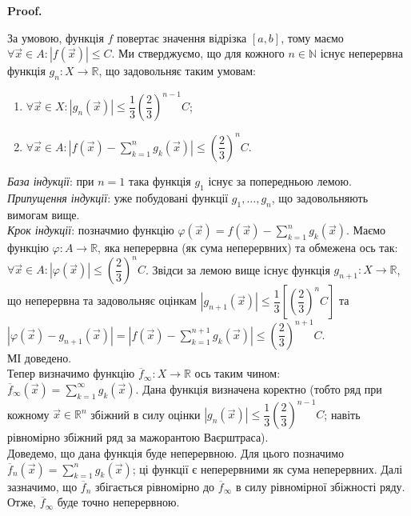 \documentclass[a4paper, 10pt]{article}
\makeatletter
\def\qed{$\blacksquare$}
\theoremstyle{theoremdd}
\theoremstyle{theoremdd}
\theoremstyle{theoremdd}
\theoremstyle{theoremdd}
\theoremstyle{theoremdd}
\theoremstyle{theoremdd}
\theoremstyle{theoremdd}
\theoremstyle{theoremdd}
\renewenvironment{proof}[1][Proof.\\]{\par
\pushQED{\hfill \qed}%
\normalfont \topsep6\p@\@plus6\p@\relax
\trivlist
\item\relax
{\bfseries
#1\@addpunct{.}}\hspace\labelsep\ignorespaces
}{%
\popQED\endtrivlist\@endpefalse
}
\makeatother
\begin{document}
\begin{proof}
За умовою, функція $f$ повертає значення відрізка $[a,b]$, тому маємо $\forall \vec{x} \in A: |f(\vec{x})| \leq C$. Ми стверджуємо, що для кожного $n \in \mathbb{N}$ існує неперервна функція $g_n \colon X \to \mathbb{R}$, що задовольняє таким умовам:
\begin{enumerate}[nosep,wide=0pt,label={\arabic*)}]
\item $\forall \vec{x} \in X: |g_n(\vec{x})| \leq \dfrac{1}{3} \left( \dfrac{2}{3}\right)^{n-1} C$;
\item $\forall \vec{x} \in A: \displaystyle\left| f(\vec{x}) - \sum_{k=1}^n g_k(\vec{x}) \right| \leq \left( \dfrac{2}{3} \right)^n C$.
\end{enumerate}
\textit{База індукції}: при $n = 1$ така функція $g_1$ існує за попередньою лемою.\\
\textit{Припущення індукції}: уже побудовані функції $g_1,\dots,g_n$, що задовольняють вимогам вище.\\
\textit{Крок індукції}: позначмио функцію $\varphi(\vec{x}) = \displaystyle f(\vec{x}) - \sum_{k=1}^n g_k(\vec{x})$. Маємо функцію $\varphi \colon A \to \mathbb{R}$, яка неперервна (як сума неперервних) та обмежена ось так: $\forall \vec{x} \in A: |\varphi(\vec{x})| \leq \left( \dfrac{2}{3} \right)^n C$. Звідси за лемою вище існує функція $g_{n+1} \colon X \to \mathbb{R}$, що неперервна та задовольняє оцінкам $|g_{n+1}(\vec{x})| \leq \dfrac{1}{3} \left[ \left(\dfrac{2}{3}\right)^n C \right]$ та $|\varphi(\vec{x}) - g_{n+1}(\vec{x})| = \displaystyle\left| f(\vec{x}) - \sum_{k=1}^{n+1} g_k(\vec{x}) \right| \leq \left( \dfrac{2}{3} \right)^{n+1}C$.\\
МІ доведено. \\
Тепер визначимо функцію $\overline{f}_{\infty} \colon X \to \mathbb{R}$ ось таким чином: $\overline{f}_\infty(\vec{x}) = \displaystyle\sum_{k=1}^\infty g_k(\vec{x})$. Дана функція визначена коректно (тобто ряд при кожному $\vec{x} \in \mathbb{R}^n$ збіжний в силу оцінки $|g_n(\vec{x})| \leq \dfrac{1}{3} \left( \dfrac{2}{3}\right)^{n-1}C$; навіть рівномірно збіжний ряд за мажорантою Ваєрштраса). \\
Доведемо, що дана функція буде неперервною. Для цього позначимо $\overline{f}_n(\vec{x}) = \displaystyle\sum_{k=1}^n g_k(\vec{x})$; ці функції є неперервними як сума неперервних. Далі зазначимо, що $\overline{f}_n$ збігається рівномірно до $\overline{f}_\infty$ в силу рівномірної збіжності ряду. Отже, $\overline{f}_\infty$ буде точно неперервною.\\

\end{proof}
\end{document}
